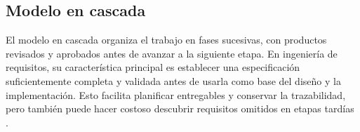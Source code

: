 
\subsection{Modelo en cascada}
\label{sec:modelo-cascada}

El modelo en cascada organiza el trabajo en fases sucesivas, con productos
revisados y aprobados antes de avanzar a la siguiente etapa. En ingeniería
de requisitos, su característica principal es establecer una especificación
suficientemente completa y validada antes de usarla como base del diseño y
la implementación. Esto facilita planificar entregables y conservar la
trazabilidad, pero también puede hacer costoso descubrir requisitos omitidos
en etapas tardías \cite{swebok2024,pohl2025}.

